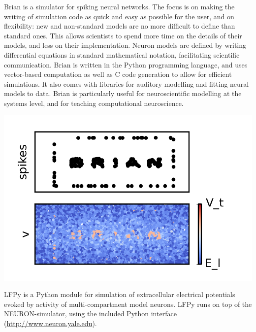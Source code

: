 \begin{multicols}{3}

Brian is a simulator for spiking neural networks. The focus is on making the writing of simulation code as quick and easy as possible for the user, and on flexibility: new and non-standard models are no more difficult to define than standard ones. This allows scientists to spend more time on the details of their models, and less on their implementation. Neuron models are defined by writing differential equations in standard mathematical notation, facilitating scientific communication. Brian is written in the Python programming language, and uses vector-based computation as well as C code generation to allow for efficient simulations. It also comes with libraries for auditory modelling and fitting neural models to data. Brian is particularly useful for neuroscientific modelling at the systems level, and for teaching computational neuroscience.

\begin{center}
\includegraphics[width=\columnwidth]{../pics/brian_raster.png}
\end{center}


LFPy is a Python module for simulation of extracellular electrical
potentials evoked by activity of multi-compartment model neurons.
LFPy runs on top of the NEURON-simulator, using the included Python interface
(\url{http://www.neuron.yale.edu}).


\end{multicols}
